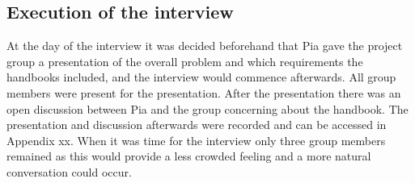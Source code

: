 \subsection{Execution of the interview} \label{sec:firstinterview}

At the day of the interview it was decided beforehand that Pia gave the project group a presentation of the overall problem and which requirements the handbooks included, and the interview would commence afterwards. All group members were present for the presentation. After the presentation there was an open discussion between Pia and the group concerning about the handbook. The presentation and discussion afterwards were recorded and can be accessed in Appendix xx. When it was time for the interview only three group members remained as this would provide a less crowded feeling and a more natural conversation could occur.
